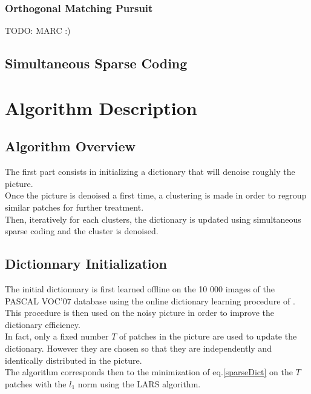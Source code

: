 \documentclass{ipol}
\begin{document}
\subsubsection{Orthogonal Matching Pursuit}
TODO: MARC :)

\subsection {Simultaneous Sparse Coding}


\section{Algorithm Description}

\subsection{ Algorithm Overview }

The first part consists in initializing a dictionary that will denoise roughly the picture.\\
Once the picture is denoised a first time, a clustering is made in order to regroup similar patches for further treatment.\\
Then, iteratively for each clusters, the dictionary is updated using simultaneous sparse coding and the cluster is denoised.

\subsection{Dictionnary Initialization}

The initial dictionnary is first learned offline on the 10 000 images of the PASCAL VOC'07 database using the  online dictionary learning procedure of \cite{onlineLearning}. This procedure is then used on the noisy picture in order to improve the dictionary efficiency.\\
In fact, only a fixed number $T$ of patches in the picture are used to update the dictionary. However they are chosen so that they are independently and identically distributed in the picture.\\
The algorithm corresponds then to the minimization of eq.\ref{sparseDict} on the $T$ patches with the $l_1$ norm using the LARS \cite{LARS} algorithm.\\
\end{document}
